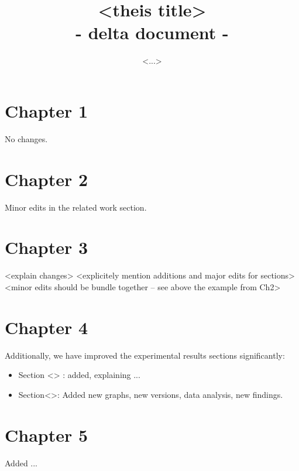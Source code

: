 \documentclass{article}
\title{<theis title> \\ - delta document -}
\author{<...>}
\begin{document}
\maketitle

\section{Chapter 1}
No changes. 

\section{Chapter 2}
Minor edits in the related work section. 

\section{Chapter 3} 
<explain changes> 
<explicitely mention additions and major edits for sections>
<minor edits should be bundle together -- see above the example from Ch2>  

\section{Chapter 4}
\noindent Additionally, we have improved the experimental results sections significantly: 
\begin{itemize}
    \item Section <> : added, explaining ... 
    \item Section<>: Added new graphs, new versions, data analysis, new findings.
\end{itemize}

\section{Chapter 5}
Added ... 
\end{document}
